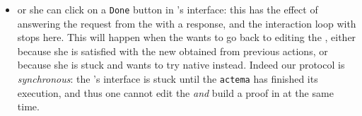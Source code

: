 \begin{itemize}
  \item or she can click on a \texttt{Done} button in 's interface: this
  has the effect of answering the  request from the
   with a  response, and the interaction loop with
   stops here. This will happen when the  wants to go back
  to editing the , either because she is satisfied with the new
   obtained from previous actions, or because she is stuck and wants to
  try native   instead. Indeed our protocol is \emph{synchronous}: the
  's interface is stuck until the \texttt{actema}  has
  finished its execution, and thus one cannot edit the  \emph{and}
  build a proof in  at the same time.
\end{itemize}

